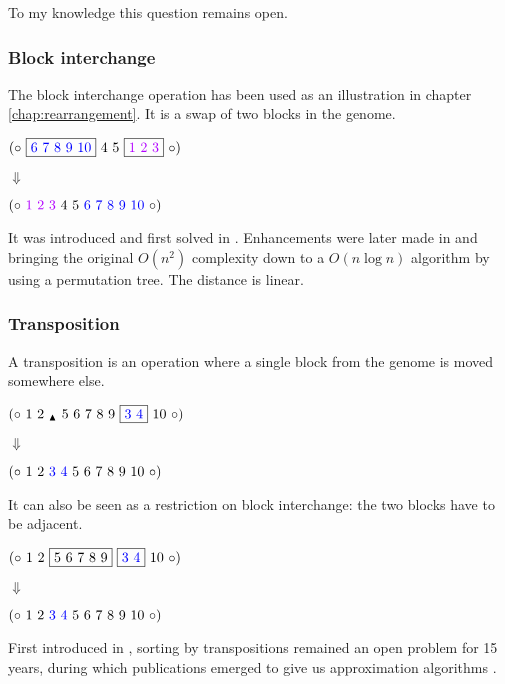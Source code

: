 \documentclass[11pt,final,twoside,nofrench]{thlifl}
\newcommand{\breakpoint}{ \textsubscript{$\textcolor{black}{\blacktriangle}$} }
\begin{document}
To my knowledge this question remains open.

\subsubsection*{Block interchange}

The block interchange operation has been used as an illustration in chapter \ref{chap:rearrangement}. It is a swap of two blocks in the genome.

\begin{center}
$(\circ~\fbox{\textcolor{blue}{6~7~8~9~10}}~4~5~\fbox{\textcolor{purple}{1~2~3}}~\circ)$

$\Downarrow$

$(\circ~\textcolor{purple}{1~2~3}~4~5~\textcolor{blue}{6~7~8~9~10}~\circ)$
\end{center}

It was introduced and first solved in \cite{Christie96}. Enhancements were later made in \cite{Lin05} and \cite{FZ07} bringing the original $O(n^2)$ complexity down to a $O(n \log n)$ algorithm by using a permutation tree. The distance is linear.

\subsubsection*{Transposition}

A transposition is an operation where a single block from the genome is moved somewhere else.

\begin{center}
$(\circ~1~2~\breakpoint~5~6~7~8~9~\fbox{\textcolor{blue}{3~4}}~10~\circ)$

$\Downarrow$

$(\circ~1~2~\textcolor{blue}{3~4}~5~6~7~8~9~10~\circ)$
\end{center}

It can also be seen as a restriction on block interchange: the two blocks have to be adjacent.

\begin{center}
$(\circ~1~2~\fbox{5~6~7~8~9}~\fbox{\textcolor{blue}{3~4}}~10~\circ)$

$\Downarrow$

$(\circ~1~2~\textcolor{blue}{3~4}~5~6~7~8~9~10~\circ)$
\end{center}

First introduced in \cite{BP95}, sorting by transpositions remained an open problem for 15 years, during which publications emerged to give us approximation algorithms
\cite{BP98} \cite{HS04}.
\end{document}
